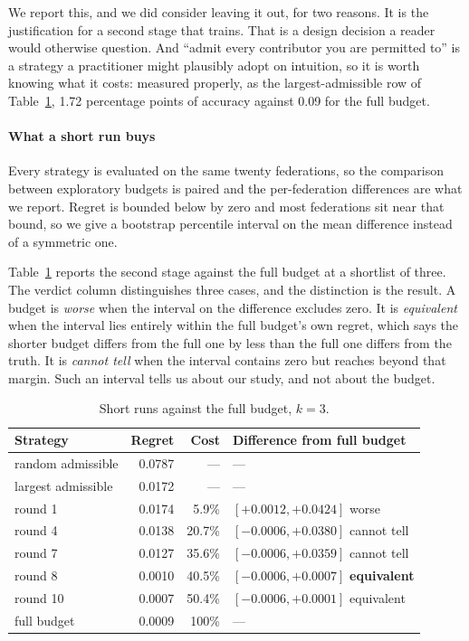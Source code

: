\documentclass[10pt,conference]{IEEEtran}
\begin{document}
We report this, and we did consider leaving it out, for two reasons. It is the justification
for a second stage that trains. That is a design decision a reader would
otherwise question. And ``admit every contributor you are permitted to'' is a
strategy a practitioner might plausibly adopt on intuition, so it is worth
knowing what it costs: measured properly, as the largest-admissible row of
Table~\ref{tab:costfidelity}, 1.72 percentage points of accuracy against 0.09
for the full budget.

\paragraph{What a short run buys}

Every strategy is evaluated on the same twenty federations, so the comparison
between exploratory budgets is paired and the per-federation differences are
what we report. Regret is bounded below by zero and most federations sit near
that bound, so we give a bootstrap percentile interval on the mean difference instead of a symmetric one.

Table~\ref{tab:costfidelity} reports the second stage against the full budget
at a shortlist of three. The verdict column distinguishes three cases, and the
distinction is the result. A budget is \emph{worse} when the interval on the
difference excludes zero. It is \emph{equivalent} when the interval lies
entirely within the full budget's own regret, which says the shorter budget
differs from the full one by less than the full one differs from the truth. It
is \emph{cannot tell} when the interval contains zero but reaches beyond that margin. Such an interval tells us about our study, and not about the budget.



\begin{table}[t]
\caption{Short runs against the full budget, $k=3$.}
\label{tab:costfidelity}
\centering
\begin{tabular}{lrrl}
\toprule
Strategy & Regret & Cost & Difference from full budget \\
\midrule
random admissible & 0.0787 & --- & --- \\
largest admissible & 0.0172 & --- & --- \\
\midrule
round 1 & 0.0174 & 5.9\% & $[+0.0012, +0.0424]$ worse \\
round 4 & 0.0138 & 20.7\% & $[-0.0006, +0.0380]$ cannot tell \\
round 7 & 0.0127 & 35.6\% & $[-0.0006, +0.0359]$ cannot tell \\
round 8 & 0.0010 & 40.5\% & $[-0.0006, +0.0007]$ \textbf{equivalent} \\
round 10 & 0.0007 & 50.4\% & $[-0.0006, +0.0001]$ equivalent \\
\midrule
full budget & 0.0009 & 100\% & --- \\
\bottomrule
\end{tabular}
\end{table}
\end{document}
